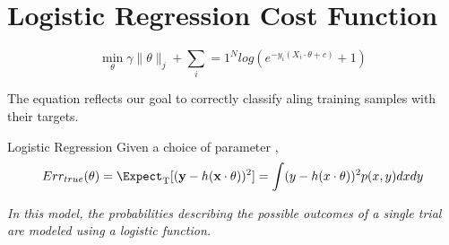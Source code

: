 \section{Logistic Regression Cost Function}

\begin{equation} \label{logit}
 \min_{\theta} \gamma\| \theta\|_{j}  + \sum_i=1^N log(e^{-y_i (X_i \cdot \theta + c )} +1) 
\end{equation}

The equation reflects our goal to correctly classify aling training samples with their targets. 

\begin{definition}{Logistic Regression}
Given a choice of parameter \theta,
\[
    Err_{true}(\theta)  = \Expect_{ \mathrm{T}}[(\textbf{y} - h(\textbf{x} \cdot \theta) )^2] \\
    = \int (y - h(x \cdot \theta) )^2 p(x,y)dxdy
\]
\end{definition}

\textit{In this model, the probabilities describing the possible outcomes of a single trial are modeled using a logistic function.}

\textit{}

\textit{}
\textit{}
\textit{}